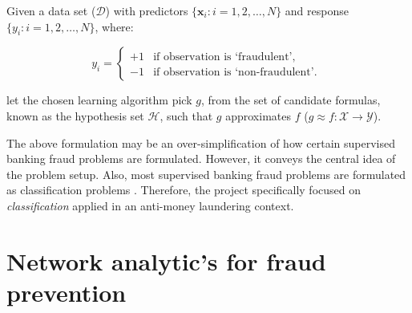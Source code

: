 Given a data set ($\mathcal{D}$) with predictors $\{\boldsymbol{x}_i:i = 1,2,\ldots,N\}$ and response $\{y_i:i = 1,2,\ldots,N\}$, where:

$$y_i = \left \{\begin{array}{ll} 
 +1 &  \text{if observation is `fraudulent'},\\ 
-1 & \text{if observation is `non-fraudulent'. } 
\end{array} \right.$$

 let the chosen learning algorithm pick $g$, from the set of candidate formulas, known as the hypothesis set $\mathcal{H}$, such that $g$ approximates $f$ ($g \approx f: \mathcal{X} \rightarrow \mathcal{Y}$). 

The above formulation may be an over-simplification of how certain supervised banking fraud problems are formulated. However, it conveys the central idea of the problem setup. Also, most supervised banking fraud problems are formulated as classification problems \citep{al2021financial, abdallah2016fraud, salehi2017data}. Therefore, the project specifically focused on \textit{classification} applied in an anti-money laundering context.

\section{Network analytic's for fraud prevention} \label{ch2_sub_heading_network}

